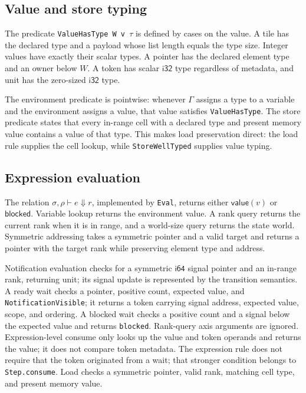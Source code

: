 \documentclass[a4paper,USenglish]{lipics-v2021}
\begin{document}
\subsection{Value and store typing}
The predicate \texttt{ValueHasType W v $\tau$} is defined by cases on the
value. A tile has the declared type and a payload whose list length equals the
type size. Integer values have exactly their scalar types. A pointer has the
declared element type and an owner below \(W\). A token has scalar
\(\mathsf{i32}\) type regardless of metadata, and unit has the zero-sized
\(\mathsf{i32}\) type.

The environment predicate is pointwise: whenever \(\Gamma\) assigns a type to
a variable and the environment assigns a value, that value satisfies
\texttt{ValueHasType}. The store predicate states that every in-range cell
with a declared type and present memory value contains a value of that type.
This makes load preservation direct: the load rule supplies the cell lookup,
while \texttt{StoreWellTyped} supplies value typing.

\subsection{Expression evaluation}
The relation \(\sigma,\rho\vdash e\Downarrow r\), implemented by
\texttt{Eval}, returns either \(\mathsf{value}(v)\) or \(\mathsf{blocked}\).
Variable lookup returns the environment value. A rank query returns the current
rank when it is in range, and a world-size query returns the state world.
Symmetric addressing takes a symmetric pointer and a valid target and returns a
pointer with the target rank while preserving element type and address.

Notification evaluation checks for a symmetric \(\mathsf{i64}\) signal pointer
and an in-range rank, returning unit; its signal update is represented by the
transition semantics. A ready wait checks a pointer, positive count, expected
value, and \texttt{NotificationVisible}; it returns a token carrying signal
address, expected value, scope, and ordering. A blocked wait checks a positive
count and a signal below the expected value and returns \texttt{blocked}.
Rank-query axis arguments are ignored. Expression-level consume only looks up
the value and token operands and returns the value; it does not compare token
metadata.
The expression rule does not require that the token originated from a wait;
that stronger condition belongs to \texttt{Step.consume}. Load checks a
symmetric pointer, valid rank, matching cell type, and present memory value.
\end{document}
